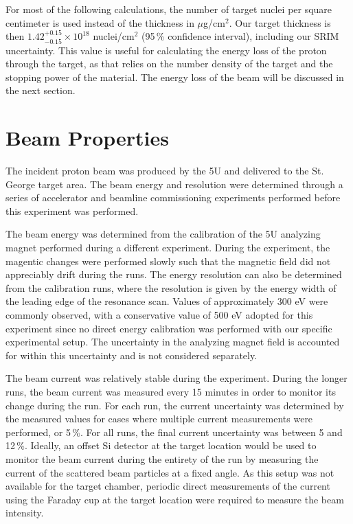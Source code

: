 For most of the following calculations, the number of target nuclei per
square centimeter is used instead of the thickness in $\mu$g/cm${}^{2}$. Our
target thickness is then $1.42^{+0.15}_{-0.15} \times 10^{18}$ nuclei/cm${}^{2}$
(95\,\% confidence interval), including our SRIM uncertainty.
This value is useful for calculating the energy loss of the proton
through the target, as that relies on the number density of the target
and the stopping power of the material. The energy loss of the beam will
be discussed in the next section.


\section{Beam Properties}
\label{sec:beam-properties}

The incident proton beam was produced by the 5U and delivered to the St.
George target area. The beam energy and resolution were determined
through a series of accelerator and beamline commissioning experiments
performed before this experiment was performed.


The beam energy was determined from the calibration of the 5U analyzing
magnet performed during a different experiment. During the experiment,
the magentic changes were performed slowly such that the magnetic field
did not appreciably drift during the runs. The energy resolution can
also be determined from the calibration runs, where the resolution is
given by the energy width of the leading edge of the resonance scan.
Values of approximately 300 eV were commonly observed, with a
conservative value of 500 eV adopted for this experiment since no direct
energy calibration was performed with our specific experimental setup.
The uncertainty in the analyzing magnet field is accounted for within
this uncertainty and is not considered separately.


The beam current was relatively stable during the experiment. During the
longer runs, the beam current was measured every 15 minutes in order to
monitor its change during the run. For each run, the current uncertainty
was determined by the measured values for cases where multiple current
measurements were performed, or 5\,\%. For all runs, the final current
uncertainty was between 5 and 12\,\%. Ideally, an offset Si detector at
the target location would be used to monitor the beam current during the
entirety of the run by measuring the current of the scattered beam
particles at a fixed angle. As this setup was not available for the
target chamber, periodic direct measurements of the current using the
Faraday cup at the target location were required to measure the beam
intensity.

